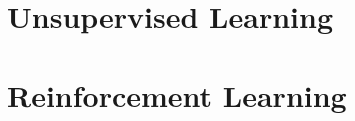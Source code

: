 \documentclass[letterpaper,10pt,english]{jupyterBook}
\begin{document}
\sphinxstepscope


\chapter{Unsupervised Learning}
\label{\detokenize{ch/ml/ul:unsupervised-learning}}\label{\detokenize{ch/ml/ul:ml-ul}}\label{\detokenize{ch/ml/ul::doc}}
\sphinxstepscope


\chapter{Reinforcement Learning}
\label{\detokenize{ch/ml/rl:reinforcement-learning}}\label{\detokenize{ch/ml/rl:ml-rl}}\label{\detokenize{ch/ml/rl::doc}}
\end{document}
